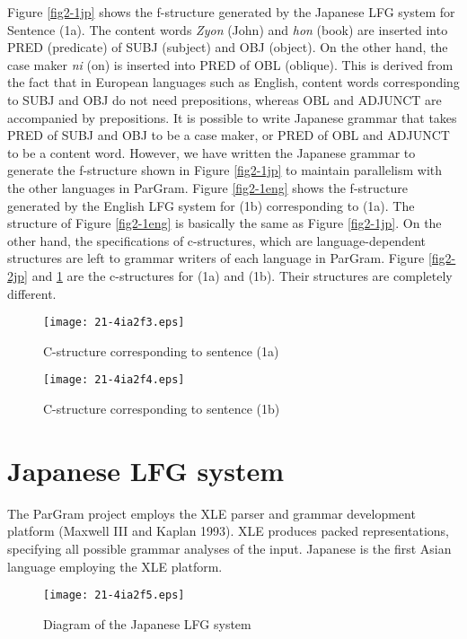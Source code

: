 \documentclass[english]{jnlp_1.4_rep}
\begin{document}
Figure \ref{fig2-1jp} shows the f-structure generated by the Japanese
LFG system for Sentence (1a).  The content words \textit{Zyon} (John)
and \textit{hon} (book) are inserted into PRED (predicate) of SUBJ
(subject) and OBJ (object). On the other hand, the case maker
\textit{ni} (on) is inserted into PRED of OBL (oblique).  This is
derived from the fact that in European languages such as English,
content words corresponding to SUBJ and OBJ do not need prepositions,
whereas OBL and ADJUNCT are accompanied by prepositions. It is
possible to write Japanese grammar that takes PRED of SUBJ and OBJ
to be a case maker, or PRED of OBL and ADJUNCT to be a content
word. However, we have written the Japanese grammar to generate the
f-structure shown in Figure \ref{fig2-1jp} to maintain parallelism
with the other languages in ParGram. Figure \ref{fig2-1eng} shows the
f-structure generated by the English LFG system for (1b) corresponding
to (1a).  The structure of Figure \ref{fig2-1eng} is basically the
same as Figure \ref{fig2-1jp}.  On the other hand, the specifications
of c-structures, which are language-dependent structures are left to
grammar writers of each language in ParGram.  Figure \ref{fig2-2jp}
and \ref{fig2-2eng} are the c-structures for (1a) and (1b).  Their
structures are completely different.

\begin{figure}[t]
\begin{center}
\texttt{[image: 21-4ia2f3.eps]}
\end{center}
\caption{C-structure corresponding to sentence (1a)}
\label{fig2-2jp}
\par\vspace{10pt}
\begin{center}
\texttt{[image: 21-4ia2f4.eps]}
\end{center}
\caption{C-structure corresponding to sentence (1b)}
\label{fig2-2eng}
\end{figure}


\section{Japanese LFG system}\label{System}

The ParGram project employs the XLE parser and grammar development
platform (Maxwell III and Kaplan 1993).  XLE produces packed
representations, specifying all possible grammar analyses of the
input.  Japanese is the first Asian language employing the XLE platform.  

\begin{figure}[t]
\begin{center}
\texttt{[image: 21-4ia2f5.eps]}
\end{center}
\caption{Diagram of the Japanese LFG system}
\label{fig1_PACLIC}
\end{figure}
\end{document}
